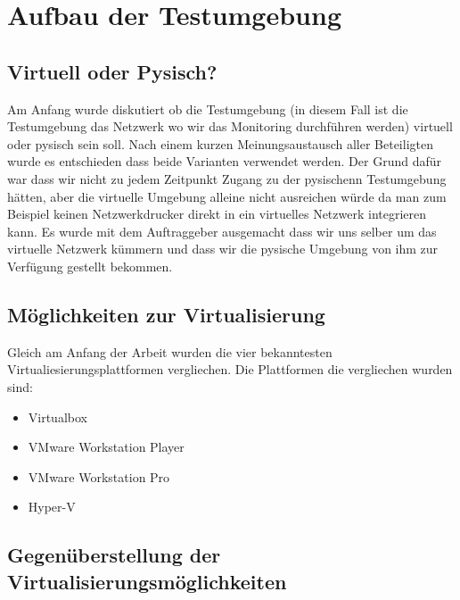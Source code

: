 \chapter{Aufbau der Testumgebung}
\label{chap: Testumgebung}

\section{Virtuell oder Pysisch?}
\label{sec: VirtuellReal}

Am Anfang wurde diskutiert ob die Testumgebung (in diesem Fall ist die Testumgebung das Netzwerk wo wir das Monitoring durchführen werden) 
virtuell oder pysisch sein soll. Nach einem kurzen Meinungsaustausch aller Beteiligten wurde es entschieden dass beide Varianten verwendet werden.
 Der Grund dafür war dass wir nicht zu jedem Zeitpunkt Zugang zu der pysischenn Testumgebung hätten, aber die virtuelle Umgebung alleine nicht ausreichen 
 würde da man zum Beispiel keinen Netzwerkdrucker direkt in ein virtuelles Netzwerk integrieren kann.
 Es wurde mit dem Auftraggeber ausgemacht dass wir uns selber um das virtuelle Netzwerk kümmern und dass wir die pysische Umgebung von 
 ihm zur Verfügung gestellt bekommen.


 \section{Möglichkeiten zur Virtualisierung}
\label{sec: Verglichene Virtualiesierungsplattformen}

 Gleich am Anfang der Arbeit wurden die vier bekanntesten Virtualiesierungsplattformen vergliechen. 
 Die Plattformen die vergliechen wurden sind:

\begin{itemize}
         \item Virtualbox
         \item VMware Workstation Player
         \item VMware Workstation Pro
         \item Hyper-V
\end{itemize}

 \section{Gegenüberstellung der Virtualisierungsmöglichkeiten}
\label{sec: Gegenüberstellung der Virtualisierungsmöglichkeiten}

